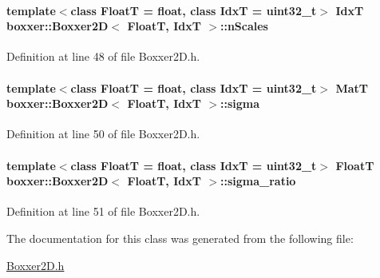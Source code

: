 \paragraph[{\texorpdfstring{n\+Scales}{nScales}}]{\setlength{\rightskip}{0pt plus 5cm}template$<$class FloatT  = float, class IdxT  = uint32\+\_\+t$>$ IdxT {\bf boxxer\+::\+Boxxer2D}$<$ FloatT, IdxT $>$\+::n\+Scales}\hypertarget{classboxxer_1_1Boxxer2D_a7577d773fec8de75968ef12fe2c1c59b}{}\label{classboxxer_1_1Boxxer2D_a7577d773fec8de75968ef12fe2c1c59b}


Definition at line 48 of file Boxxer2\+D.\+h.

\paragraph[{\texorpdfstring{sigma}{sigma}}]{\setlength{\rightskip}{0pt plus 5cm}template$<$class FloatT  = float, class IdxT  = uint32\+\_\+t$>$ {\bf MatT} {\bf boxxer\+::\+Boxxer2D}$<$ FloatT, IdxT $>$\+::sigma}\hypertarget{classboxxer_1_1Boxxer2D_a925fe4151cca3a34cba36f1a10b8e382}{}\label{classboxxer_1_1Boxxer2D_a925fe4151cca3a34cba36f1a10b8e382}


Definition at line 50 of file Boxxer2\+D.\+h.

\paragraph[{\texorpdfstring{sigma\+\_\+ratio}{sigma_ratio}}]{\setlength{\rightskip}{0pt plus 5cm}template$<$class FloatT  = float, class IdxT  = uint32\+\_\+t$>$ FloatT {\bf boxxer\+::\+Boxxer2D}$<$ FloatT, IdxT $>$\+::sigma\+\_\+ratio}\hypertarget{classboxxer_1_1Boxxer2D_a0fffedee4a39644c5c48fba99e297111}{}\label{classboxxer_1_1Boxxer2D_a0fffedee4a39644c5c48fba99e297111}


Definition at line 51 of file Boxxer2\+D.\+h.



The documentation for this class was generated from the following file\+:\begin{DoxyCompactItemize}
\item 
\hyperlink{Boxxer2D_8h}{Boxxer2\+D.\+h}\end{DoxyCompactItemize}
